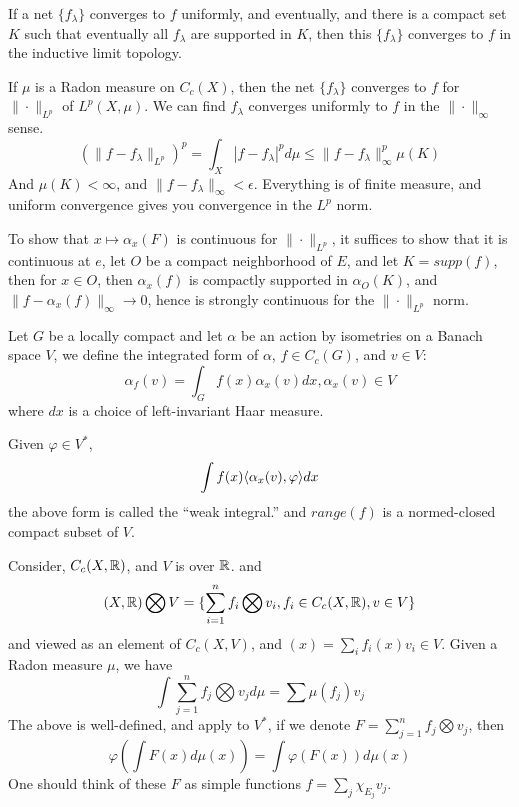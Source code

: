 \begin{definition}
    If a net $\{f_\lambda\}$ converges to $f$ uniformly, and eventually, and there is a compact set $K$ such that eventually all $f_\lambda$ are supported in $K$, then this $\{f_\lambda\}$ converges to $f$ in the inductive limit topology.
\end{definition}
If $\mu$ is a Radon measure on $C_c(X)$, then the net $\{f_\lambda\}$ converges to $f$ for $\|\cdot\|_{L^p}$ of $L^p(X,\mu)$. We can find $f_\lambda$ converges uniformly to $f$ in the $\|\cdot\|_\infty$ sense.
\begin{equation*}
    \left(\|f-f_\lambda\|_{L^p}\right)^p=\int_X|f-f_\lambda|^pd\mu\leq\|f-f_\lambda\|_\infty^p\mu(K)
\end{equation*}
And $\mu(K)<\infty$, and $\|f-f_\lambda\|_\infty<\epsilon$. Everything is of finite measure, and uniform convergence gives you convergence in the $L^p$ norm.

To show that $x\mapsto\alpha_x(F)$ is continuous for $\|\cdot\|_{L^p}$, it suffices to show that it is continuous at $e$, let $O$  be a compact neighborhood of $E$, and let $K=supp(f)$, then for $x\in O$, then $\alpha_x(f)$ is compactly supported in $\alpha_O(K)$, and $\|f-\alpha_x(f)\|_\infty\to 0$, hence is strongly continuous for the $\|\cdot\|_{L^p}$ norm.

Let $G$ be a locally compact and let $\alpha$ be an action by isometries on a Banach space $V$, we define the integrated form of $\alpha$, $f\in C_c(G)$, and $v\in V$:
\begin{equation*}
    \alpha_f(v)=\int_Gf(x)\alpha_x(v)dx, \alpha_x(v)\in V
\end{equation*}
where $dx$ is a choice of left-invariant Haar measure.

Given $\varphi\in V^*$,
\begin{equation*}
    \int f(x)\langle \alpha_x(v), \varphi\rangle dx
\end{equation*}
the above form is called the ``weak integral.''
and $range(f)$ is a normed-closed compact subset of $V$.

Consider, $C_c(X,\mathbb{R})$, and $V$ is over $\mathbb{R}$. and \begin{equation*}
    (X,\mathbb{R})\bigotimes V=\{\sum_{i=1}^n f_i\bigotimes  v_i, f_i\in C_c(X,\mathbb{R}), v\in V\}
\end{equation*}
and viewed as an element of $C_c(X,V)$, and $(x)=\sum_{i} f_i(x)v_i\in V$. Given a Radon measure $\mu$, we have
\begin{equation*}
    \int \sum_{j=1}^nf_j\bigotimes v_jd\mu=\sum\mu(f_j)v_j
\end{equation*}
The above is well-defined, and apply to $V^*$, if we denote $F=\sum_{j=1}^nf_j\bigotimes v_j$, then
\begin{equation*}
    \varphi(\int F(x)d\mu(x))=\int\varphi(F(x))d\mu(x)
\end{equation*}
One should think of these $F$ as simple functions $f=\sum_j\chi_{E_j}v_j$.

